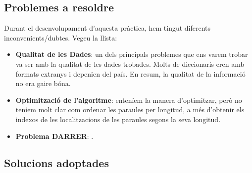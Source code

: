 \documentclass[conference]{IEEEtran}
\begin{document}
\subsection{Problemes a resoldre}
    Durant el desenvolupament d'aquesta pràctica, hem tingut diferents inconvenients/dubtes. Vegeu la llista:

    \begin{itemize}
        \item \textbf{Qualitat de les Dades}: un dels principals problemes que ens varem trobar va ser amb la qualitat de les dades trobades. Molts de diccionaris eren amb formats extranys i depenien del país. En resum, la qualitat de la informació no era gaire bóna.


        \item \textbf{Optimització de l'algoritme}: enteníem la manera d'optimitzar, però no teníem molt clar com ordenar les paraules per longitud, a més d'obtenir els indexos de les localitzacions de les paraules segons la seva longitud.

        \item \textbf{Problema DARRER}: .
        \\
    \end{itemize}
    \subsection{Solucions adoptades}
\end{document}
